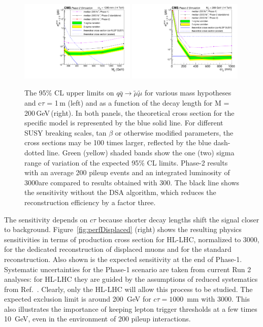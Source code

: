 \begin{figure}[hbtp]\begin{center}
\includegraphics[width=0.49\textwidth]{figures/LimitComparison_withStandAloneEff.pdf}
\includegraphics[width=0.49\textwidth]{figures/LimitComparison_asfuncofCtau.pdf}
\caption{The 95\% CL upper limits on  $q \bar q \to \widetilde{\mu} \widetilde{\mu}$ 
for various mass hypotheses and c$\tau$ = 1\,m (left) and as a function of the decay length for M = 200\,GeV\,(right).
In both panels, the theoretical cross section for the specific model is represented by the blue solid line.
For different SUSY breaking scales, tan $\beta$ or otherwise modified parameters, the cross sections may be  100 times larger, reflected by the blue dash-dotted line.
Green (yellow) shaded bands show the one (two) sigma range of variation of the expected 95\% CL limits. Phase-2 results with an average 200 pileup events and an integrated luminosity of 3000\fbinv are compared to results obtained with 300\fbinv. The black line shows the sensitivity without the DSA algorithm, which reduces the reconstruction efficiency by a factor three.
 }
\label{fig:displResults}
\end{center}
\end{figure}

The sensitivity depends on $c\tau$ because shorter decay lengths shift the signal closer to background. Figure~\ref{fig:perfDisplaced} (right) shows the resulting physics sensitivities in terms of production cross section for HL-LHC, normalized to 3000\fbinv, for the dedicated reconstruction of displaced muons and for the standard reconstruction. Also shown is the expected sensitivity at the end of Phase-1.
Systematic uncertainties for the Phase-1 scenario are taken from current Run 2 analyses: 
for HL-LHC they are guided by the assumptions of reduced systematics from Ref.~\cite{FTR-16-005}.
Clearly, only the HL-LHC will allow this process to be studied. 
The expected
exclusion limit is around 200~GeV for $c\tau = 1000$~mm with 3000\fbinv.
This also illustrates the importance
of keeping lepton trigger thresholds at a few times 10~GeV, even in the environment of 200 pileup interactions.   

